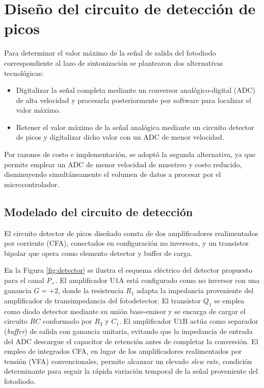 \chapter{Diseño del circuito de detección de picos}
\label{cap:diseno_deteccion_picos}

Para determinar el valor máximo de la señal de salida del fotodiodo correspondiente al lazo de sintonización se plantearon dos alternativas tecnológicas:

\begin{itemize}
  \item Digitalizar la señal completa mediante un conversor analógico-digital (ADC) de alta velocidad y procesarla posteriormente por software para localizar el valor máximo.
  \item Retener el valor máximo de la señal analógica mediante un circuito detector de picos y digitalizar dicho valor con un ADC de menor velocidad.
\end{itemize}

Por razones de costo e implementación, se adoptó la segunda alternativa, ya que permite emplear un ADC de menor velocidad de muestreo y costo reducido, disminuyendo simultáneamente el volumen de datos a procesar por el microcontrolador.

\section{Modelado del circuito de detección}
\label{sec:modelado_simulacion}

El circuito detector de picos diseñado consta de dos amplificadores realimentados por corriente (CFA), conectados en configuración no inversora, y un transistor bipolar que opera como elemento detector y buffer de carga. 

En la Figura \ref{fig:detector} se ilustra el esquema eléctrico del detector propuesto para el canal $P_+$. El amplificador $\text{U1A}$ está configurado como no inversor con una ganancia $G = +2$, donde la resistencia $R_1$ adapta la impedancia proveniente del amplificador de transimpedancia del fotodetector. El transistor $Q_1$ se emplea como diodo detector mediante su unión base-emisor y se encarga de cargar el circuito $RC$ conformado por $R_3$ y $C_1$. El amplificador $\text{U1B}$ actúa como separador (\emph{buffer}) de salida con ganancia unitaria, evitando que la impedancia de entrada del ADC descargue el capacitor de retención antes de completar la conversión. El empleo de integrados CFA, en lugar de los amplificadores realimentados por tensión (VFA) convencionales, permite alcanzar un elevado \emph{slew rate}, condición determinante para seguir la rápida variación temporal de la señal proveniente del fotodiodo.

